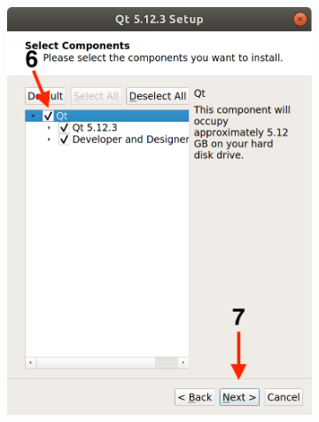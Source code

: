 \begin{figure}[H]
\begin{subfigure}{0.32\linewidth}
        \includegraphics[width=1\textwidth]{images/Qt6.png}
    \end{subfigure}
    \begin{subfigure}{0.32\linewidth}

\end{subfigure}
\end{figure}
